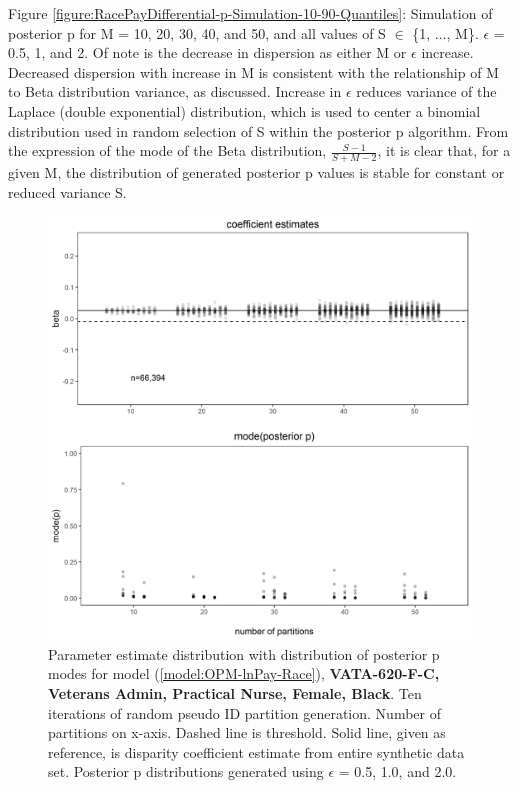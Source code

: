 \documentclass[10pt, letterpaper]{article}
\begin{document}
\begin{spacing}{1.0}
\vspace{12pt}

Figure \ref{figure:RacePayDifferential-p-Simulation-10-90-Quantiles}:  Simulation of posterior p for M = 10, 20, 30, 40, and 50, and all values of S $\in$ \{1, ..., M\}.  $\epsilon$ = 0.5, 1, and 2.  Of note is the decrease in dispersion as either M or $\epsilon$ increase.  Decreased dispersion with increase in M is consistent with the relationship of M to Beta distribution variance, as discussed.  Increase in $\epsilon$ reduces variance of the Laplace (double exponential) distribution, which is used to center a binomial distribution used in random selection of S within the posterior p algorithm.  From the expression of the mode of the Beta distribution, $\frac{S-1}{S+M-2}$, it is clear that, for a given M, the distribution of generated posterior p values is stable for constant or reduced variance S. 

\clearpage

\begin{figure}[h]
    \centering
    \includegraphics[width=5in]{images/RacePayDifferentialBetaWithPosteriorDistribution-VATA-620-F-C.png}
    \caption{Parameter estimate distribution with distribution of posterior p modes for model (\ref{model:OPM-lnPay-Race}), \textbf{VATA-620-F-C, Veterans Admin, Practical Nurse, Female, Black}.  Ten iterations of random pseudo ID partition generation.  Number of partitions on x-axis.  Dashed line is threshold.  Solid line, given as reference, is disparity coefficient estimate from entire synthetic data set.  Posterior p distributions generated using $\epsilon$ = 0.5, 1.0, and 2.0.}
    \label{figure:RacePayDifferentialBetaWithPosteriorDistribution-VATA-620-F-C}
\end{figure}


\end{spacing}
\end{document}
